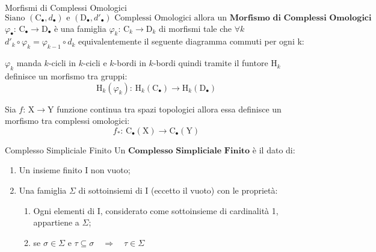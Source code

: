 \documentclass[11pt, a4paper, twoside]{article}
\begin{document}
\begin{defn}{Morfismi di Complessi Omologici}{}
	$\text{Siano } (\text{C}_{\bullet},d_{\bullet}) \text{ e }  (\text{D}_{\bullet},d'_{\bullet}) \text{ Complessi Omologici allora un } \textbf{Morfismo di Complessi Omologici }$ $\varphi_{\bullet}:\,\text{C}_{\bullet}\rightarrow\text{D}_{\bullet}$ è una famiglia $\varphi_k:\,\text{C}_{k}\rightarrow\text{D}_{k}$ di morfismi tale che $\forall k$ $d'_{k}\circ\varphi_{k}=\varphi_{k-1}\circ d_{k}$ equivalentemente il seguente diagramma commuti per ogni k:
	\begin{center}
	\end{center}
\end{defn}

\begin{oss}
	$\varphi_k$ manda $k$-cicli in $k$-cicli e $k$-bordi in $k$-bordi quindi tramite il funtore $\text{H}_k$ definisce un morfismo tra gruppi:
	\[
		\text{H}_k(\varphi_k):\,\text{H}_k(\text{C}_{\bullet})\rightarrow\text{H}_k(\text{D}_{\bullet})
	\]
\end{oss}

\begin{es}
	Sia $f:\,\text{X}\rightarrow \text{Y}$ funzione continua tra spazi topologici allora essa definisce un morfismo tra complessi omologici:
	\[
		f_*:\,\text{C}_{\bullet}(\text{X})\rightarrow\text{C}_{\bullet}(\text{Y})
	\]
\end{es}

\begin{defn}{Complesso Simpliciale Finito}{}
	Un $\textbf{Complesso Simpliciale Finito}$ è il dato di:
	\begin{enumerate}
		\item Un insieme finito I non vuoto;
		\item Una famiglia $\Sigma$ di sottoinsiemi di I (eccetto il vuoto) con le proprietà:
		\begin{enumerate}
			\item Ogni elementi di I, considerato come sottoinsieme di cardinalità 1, appartiene a $\Sigma$;
			\item se $\sigma\in\Sigma$ e $\tau\subseteq\sigma\quad\Rightarrow\quad\tau\in\Sigma$
		\end{enumerate}
	\end{enumerate}
\end{defn}
\end{document}
